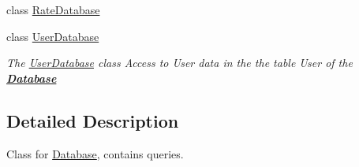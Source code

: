 \begin{DoxyCompactItemize}
class \hyperlink{classDatabases_1_1RateDatabase}{Rate\-Database}
\item 
class \hyperlink{classDatabases_1_1UserDatabase}{User\-Database}
\begin{DoxyCompactList}\small\item\em The \hyperlink{classDatabases_1_1UserDatabase}{User\-Database} class Access to User data in the the table User of the {\bfseries \hyperlink{classDatabases_1_1Database}{Database}} \end{DoxyCompactList}\end{DoxyCompactItemize}


\subsection{Detailed Description}
Class for \hyperlink{classDatabases_1_1Database}{Database}, contains queries. 
